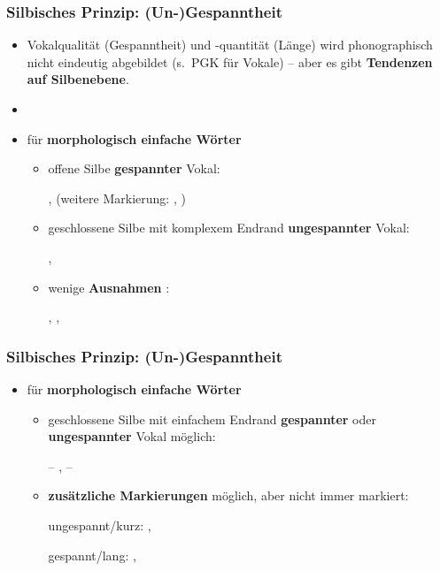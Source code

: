 \begin{frame}
\frametitle{Silbisches Prinzip: (Un-)Gespanntheit}

\begin{itemize}
	\item Vokalqualität (\dash Gespanntheit) und -quantität (\dash Länge) wird phonographisch nicht eindeutig abgebildet (s.\ PGK für Vokale) -- aber es gibt \textbf{Tendenzen auf Silbenebene}.
	\item[]
	\item für \textbf{morphologisch einfache Wörter} 
	
	\begin{itemize}
		\item offene Silbe \ras \textbf{gespannter} Vokal: 
		
		\ea {},  (weitere Markierung: , )
		\z
		
		\item geschlossene Silbe mit komplexem Endrand \ras \textbf{ungespannter} Vokal: 
		
		\ea
		, 
		\z
		
		\item wenige \textbf{Ausnahmen} \citep[vgl.][15]{Fuhrhop09a}: 
		
		\ea
		, , 
		\z
		
	\end{itemize}
\end{itemize}
\end{frame}


\begin{frame}
\frametitle{Silbisches Prinzip: (Un-)Gespanntheit}

\begin{itemize}
	\item für \textbf{morphologisch einfache Wörter}
	
	\begin{itemize}
		\item geschlossene Silbe mit einfachem Endrand \ras \textbf{gespannter} oder \textbf{ungespannter} Vokal möglich:
		
		\ea {} -- ,  -- 
		\z

\pause 
		
		\item \textbf{zusätzliche Markierungen} möglich, aber nicht immer markiert: 
		
		\ea 
			\ea ungespannt/kurz: , 
		
			\ex gespannt/lang: , 
			\z
		\z 
	\end{itemize}
\end{itemize}

\end{frame}


